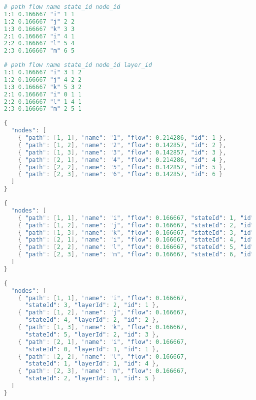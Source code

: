 \documentclass[aps,rmp,floats,floatfix,twocolumn,superscriptaddress,final]{revtex4-2}
\begin{document}
\begin{lstlisting}[language=Python,label={lst:tree_states},caption=\texttt{tree} states format]
# path flow name state_id node_id
1:1 0.166667 "i" 1 1
1:2 0.166667 "j" 2 2
1:3 0.166667 "k" 3 3
2:1 0.166667 "i" 4 1
2:2 0.166667 "l" 5 4
2:3 0.166667 "m" 6 5
\end{lstlisting}

\begin{lstlisting}[language=Python,label={lst:tree_multilayer},caption=\texttt{tree} multilayer format]
# path flow name state_id node_id layer_id
1:1 0.166667 "i" 3 1 2
1:2 0.166667 "j" 4 2 2
1:3 0.166667 "k" 5 3 2
2:1 0.166667 "i" 0 1 1
2:2 0.166667 "l" 1 4 1
2:3 0.166667 "m" 2 5 1
\end{lstlisting}

\begin{lstlisting}[language=C,label={lst:json},caption=\texttt{json} format]
{
  "nodes": [
    { "path": [1, 1], "name": "1", "flow": 0.214286, "id": 1 },
    { "path": [1, 2], "name": "2", "flow": 0.142857, "id": 2 },
    { "path": [1, 3], "name": "3", "flow": 0.142857, "id": 3 },
    { "path": [2, 1], "name": "4", "flow": 0.214286, "id": 4 },
    { "path": [2, 2], "name": "5", "flow": 0.142857, "id": 5 },
    { "path": [2, 3], "name": "6", "flow": 0.142857, "id": 6 }
  ]
}
\end{lstlisting}

\begin{lstlisting}[language=C,label={lst:json_states},caption=\texttt{json} states format]
{
  "nodes": [
    { "path": [1, 1], "name": "i", "flow": 0.166667, "stateId": 1, "id": 1 },
    { "path": [1, 2], "name": "j", "flow": 0.166667, "stateId": 2, "id": 2 },
    { "path": [1, 3], "name": "k", "flow": 0.166667, "stateId": 3, "id": 3 },
    { "path": [2, 1], "name": "i", "flow": 0.166667, "stateId": 4, "id": 1 },
    { "path": [2, 2], "name": "l", "flow": 0.166667, "stateId": 5, "id": 4 },
    { "path": [2, 3], "name": "m", "flow": 0.166667, "stateId": 6, "id": 5 }
  ]
}
\end{lstlisting}

\begin{lstlisting}[language=C,label={lst:json_multilayer},caption=\texttt{json} multilayer format]
{
  "nodes": [
    { "path": [1, 1], "name": "i", "flow": 0.166667,
      "stateId": 3, "layerId": 2, "id": 1 },
    { "path": [1, 2], "name": "j", "flow": 0.166667,
      "stateId": 4, "layerId": 2, "id": 2 },
    { "path": [1, 3], "name": "k", "flow": 0.166667,
      "stateId": 5, "layerId": 2, "id": 3 },
    { "path": [2, 1], "name": "i", "flow": 0.166667,
      "stateId": 0, "layerId": 1, "id": 1 },
    { "path": [2, 2], "name": "l", "flow": 0.166667,
      "stateId": 1, "layerId": 1, "id": 4 },
    { "path": [2, 3], "name": "m", "flow": 0.166667,
      "stateId": 2, "layerId": 1, "id": 5 }
  ]
}
\end{lstlisting}
\end{document}

